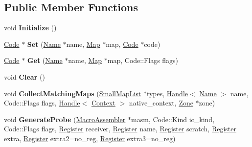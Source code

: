 \subsection*{Public Member Functions}
\begin{DoxyCompactItemize}
\item 
void {\bfseries Initialize} ()\hypertarget{classv8_1_1internal_1_1_stub_cache_a1d7461d9541a76fea7335451d844449b}{}\label{classv8_1_1internal_1_1_stub_cache_a1d7461d9541a76fea7335451d844449b}

\item 
\hyperlink{classv8_1_1internal_1_1_code}{Code} $\ast$ {\bfseries Set} (\hyperlink{classv8_1_1internal_1_1_name}{Name} $\ast$name, \hyperlink{classv8_1_1internal_1_1_map}{Map} $\ast$map, \hyperlink{classv8_1_1internal_1_1_code}{Code} $\ast$code)\hypertarget{classv8_1_1internal_1_1_stub_cache_ade482f9122cb2bff3b0136f3e4cc313b}{}\label{classv8_1_1internal_1_1_stub_cache_ade482f9122cb2bff3b0136f3e4cc313b}

\item 
\hyperlink{classv8_1_1internal_1_1_code}{Code} $\ast$ {\bfseries Get} (\hyperlink{classv8_1_1internal_1_1_name}{Name} $\ast$name, \hyperlink{classv8_1_1internal_1_1_map}{Map} $\ast$map, Code\+::\+Flags flags)\hypertarget{classv8_1_1internal_1_1_stub_cache_a42b3c283ccc57467f9f1cd00b43d42f4}{}\label{classv8_1_1internal_1_1_stub_cache_a42b3c283ccc57467f9f1cd00b43d42f4}

\item 
void {\bfseries Clear} ()\hypertarget{classv8_1_1internal_1_1_stub_cache_ab9c691287872be2c5d6dacb76b7635b4}{}\label{classv8_1_1internal_1_1_stub_cache_ab9c691287872be2c5d6dacb76b7635b4}

\item 
void {\bfseries Collect\+Matching\+Maps} (\hyperlink{classv8_1_1internal_1_1_small_map_list}{Small\+Map\+List} $\ast$types, \hyperlink{classv8_1_1internal_1_1_handle}{Handle}$<$ \hyperlink{classv8_1_1internal_1_1_name}{Name} $>$ name, Code\+::\+Flags flags, \hyperlink{classv8_1_1internal_1_1_handle}{Handle}$<$ \hyperlink{classv8_1_1internal_1_1_context}{Context} $>$ native\+\_\+context, \hyperlink{classv8_1_1internal_1_1_zone}{Zone} $\ast$zone)\hypertarget{classv8_1_1internal_1_1_stub_cache_ae127fb4575c4d6dad0c436fec0a68081}{}\label{classv8_1_1internal_1_1_stub_cache_ae127fb4575c4d6dad0c436fec0a68081}

\item 
void {\bfseries Generate\+Probe} (\hyperlink{classv8_1_1internal_1_1_macro_assembler}{Macro\+Assembler} $\ast$masm, Code\+::\+Kind ic\+\_\+kind, Code\+::\+Flags flags, \hyperlink{structv8_1_1internal_1_1_register}{Register} receiver, \hyperlink{structv8_1_1internal_1_1_register}{Register} name, \hyperlink{structv8_1_1internal_1_1_register}{Register} scratch, \hyperlink{structv8_1_1internal_1_1_register}{Register} extra, \hyperlink{structv8_1_1internal_1_1_register}{Register} extra2=no\+\_\+reg, \hyperlink{structv8_1_1internal_1_1_register}{Register} extra3=no\+\_\+reg)\hypertarget{classv8_1_1internal_1_1_stub_cache_a73e46d89db6ba3c7e9362a32f9d2d3d4}{}\label{classv8_1_1internal_1_1_stub_cache_a73e46d89db6ba3c7e9362a32f9d2d3d4}


\end{DoxyCompactItemize}
